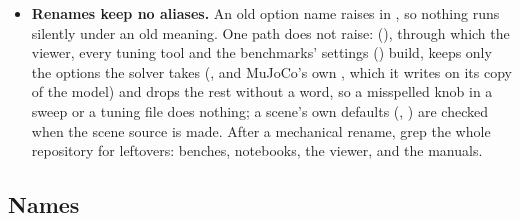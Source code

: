 \begin{itemize}
\item \textbf{Renames keep no aliases.} An old option name raises in , so nothing runs silently under an old meaning. One path does not raise:  (), through which the viewer, every tuning tool and the benchmarks' settings () build, keeps only the options the solver takes (, and MuJoCo's own , which it writes on its copy of the model) and drops the rest without a word, so a misspelled knob in a sweep or a tuning file does nothing; a scene's own defaults (, ) are checked when the scene source is made. After a mechanical rename, grep the whole repository for leftovers: benches, notebooks, the viewer,  and the manuals.
\end{itemize}

\subsection{Names}\label{sec:naming}

